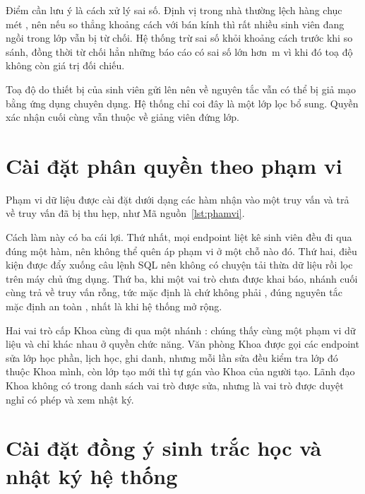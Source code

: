 Điểm cần lưu ý là cách xử lý sai số. Định vị trong nhà thường lệch hàng chục
mét \cite{Zandbergen2011Positional}, nên nếu so thẳng khoảng cách với bán kính thì rất nhiều sinh viên đang
ngồi trong lớp vẫn bị từ chối. Hệ thống trừ sai số khỏi khoảng cách trước khi
so sánh, đồng thời từ chối hẳn những báo cáo có sai số lớn hơn
\FsaiSoGps{}\,m vì khi đó toạ độ không còn giá trị đối chiếu.

\begin{luuy}
Toạ độ do thiết bị của sinh viên gửi lên nên về nguyên tắc vẫn có thể bị giả
mạo bằng ứng dụng chuyên dụng. Hệ thống chỉ coi đây là một lớp lọc bổ sung.
Quyền xác nhận cuối cùng vẫn thuộc về giảng viên đứng lớp.
\end{luuy}

\section{Cài đặt phân quyền theo phạm vi}

Phạm vi dữ liệu được cài đặt dưới dạng các hàm nhận vào một truy vấn và trả
về truy vấn đã bị thu hẹp, như Mã nguồn~\ref{lst:phamvi}.



Cách làm này có ba cái lợi. Thứ nhất, mọi endpoint liệt kê sinh viên đều đi
qua đúng một hàm, nên không thể quên áp phạm vi ở một chỗ nào đó. Thứ hai,
điều kiện được đẩy xuống câu lệnh SQL nên không có chuyện tải thừa dữ liệu
rồi lọc trên máy chủ ứng dụng. Thứ ba, khi một vai trò chưa được khai báo,
nhánh cuối cùng trả về truy vấn rỗng, tức mặc định là  chứ
không phải , đúng nguyên tắc mặc định an toàn  \cite{Saltzer1975Protection}, nhất là khi hệ thống mở rộng.

Hai vai trò cấp Khoa cùng đi qua một nhánh : chúng thấy
cùng một phạm vi dữ liệu và chỉ khác nhau ở quyền chức năng. Văn phòng Khoa
được gọi các endpoint sửa lớp học phần, lịch học, ghi danh, nhưng mỗi lần sửa
đều kiểm tra lớp đó thuộc Khoa mình, còn lớp tạo mới thì tự gán vào Khoa của
người tạo. Lãnh đạo Khoa không có trong danh sách vai trò được sửa, nhưng là
vai trò được duyệt nghỉ có phép và xem nhật ký.

\section{Cài đặt đồng ý sinh trắc học và nhật ký hệ thống}

